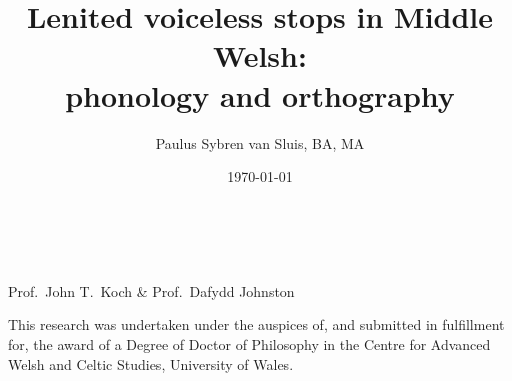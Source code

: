 \title{\LARGE Lenited voiceless stops in Middle Welsh:\\{phonology and orthography}}
\author{Paulus Sybren van Sluis, BA, MA}
\date{\today}


\begin{titlingpage}
\begin{center}
  {\thetitle}\\[3ex]
  {\Large\theauthor}\\[3ex]
  Prof.\ John T.\ Koch \& Prof.\ Dafydd Johnston
\end{center}
\bigskip
This research was undertaken under the auspices of, and submitted in fulfillment for, the award of a Degree of Doctor of Philosophy in the Centre for Advanced Welsh and Celtic Studies, University of Wales.
\begin{center}
  \vfill
  \thedate
\end{center}

\end{titlingpage}
